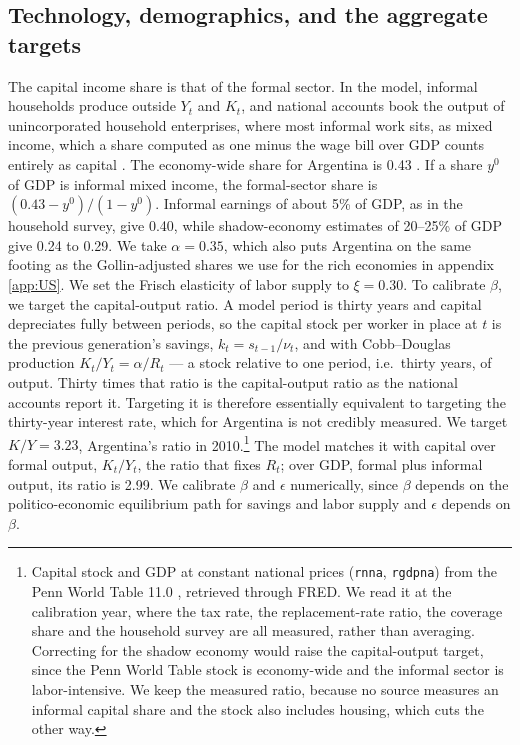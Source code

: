 \subsection{Technology, demographics, and the aggregate targets}

The capital income share is that of the formal sector. In the model, informal households produce outside $Y_t$ and $K_t$, and national accounts book the output of unincorporated household enterprises, where most informal work sits, as mixed income, which a share computed as one minus the wage bill over GDP counts entirely as capital \parencite{Gollina1}. The economy-wide share for Argentina is 0.43 \parencite{Frankema}. If a share $y^0$ of GDP is informal mixed income, the formal-sector share is $(0.43-y^0)/(1-y^0)$. Informal earnings of about 5\% of GDP, as in the household survey, give 0.40, while shadow-economy estimates of 20--25\% of GDP give 0.24 to 0.29. We take $\alpha = 0.35$, which also puts Argentina on the same footing as the Gollin-adjusted shares we use for the rich economies in appendix \ref{app:US}. We set the Frisch elasticity of labor supply to $\xi = 0.30$. To calibrate $\beta$, we target the capital-output ratio. A model period is thirty years and capital depreciates fully between periods, so the capital stock per worker in place at $t$ is the previous generation's savings, $k_t = s_{t-1}/\nu_t$, and with Cobb--Douglas production $K_t/Y_t = \alpha/R_t$ --- a stock relative to one period, i.e.\ thirty years, of output. Thirty times that ratio is the capital-output ratio as the national accounts report it. Targeting it is therefore essentially equivalent to targeting the thirty-year interest rate, which for Argentina is not credibly measured. We target $K/Y = 3.23$, Argentina's ratio in 2010.\footnote{Capital stock and GDP at constant national prices (\texttt{rnna}, \texttt{rgdpna}) from the Penn World Table 11.0 \parencite{pwt}, retrieved through FRED. We read it at the calibration year, where the tax rate, the replacement-rate ratio, the coverage share and the household survey are all measured, rather than averaging. Correcting for the shadow economy would raise the capital-output target, since the Penn World Table stock is economy-wide and the informal sector is labor-intensive. We keep the measured ratio, because no source measures an informal capital share and the stock also includes housing, which cuts the other way.} The model matches it with capital over formal output, $K_t/Y_t$, the ratio that fixes $R_t$; over GDP, formal plus informal output, its ratio is 2.99. We calibrate $\beta$ and $\epsilon$ numerically, since $\beta$ depends on the politico-economic equilibrium path for savings and labor supply and $\epsilon$ depends on $\beta$.

